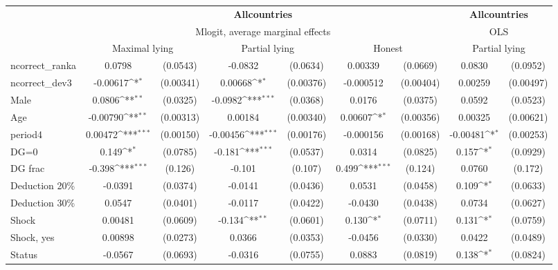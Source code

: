 \def\sym#1{\ifmmode^{#1}\else\(^{#1}\)\fi}
\begin{tabular}{l|cccccc|cc}
\hline\hline
&\multicolumn{6}{c|}{\bf All\space{}countries}&\multicolumn{2}{c}{\bf All\space{}countries}\\ &\multicolumn{6}{c|}{Mlogit, average marginal effects }&\multicolumn{2}{c}{OLS}\\
                &\multicolumn{2}{c}{Maximal lying}&\multicolumn{2}{c}{Partial lying}&\multicolumn{2}{c}{Honest}  &\multicolumn{2}{c}{Partial lying}\\
\hline
ncorrect\_ranka  &   0.0798         & (0.0543)&  -0.0832         & (0.0634)&  0.00339         & (0.0669)&   0.0830         & (0.0952)\\
ncorrect\_dev3   & -0.00617\sym{*}  &(0.00341)&  0.00668\sym{*}  &(0.00376)&-0.000512         &(0.00404)&  0.00259         &(0.00497)\\
Male            &   0.0806\sym{**} & (0.0325)&  -0.0982\sym{***}& (0.0368)&   0.0176         & (0.0375)&   0.0592         & (0.0523)\\
Age             & -0.00790\sym{**} &(0.00313)&  0.00184         &(0.00340)&  0.00607\sym{*}  &(0.00356)&  0.00325         &(0.00621)\\
period4         &  0.00472\sym{***}&(0.00150)& -0.00456\sym{***}&(0.00176)&-0.000156         &(0.00168)& -0.00481\sym{*}  &(0.00253)\\
DG=0          &    0.149\sym{*}  & (0.0785)&   -0.181\sym{***}& (0.0537)&   0.0314         & (0.0825)&    0.157\sym{*}  & (0.0929)\\
DG frac         &   -0.398\sym{***}&  (0.126)&   -0.101         &  (0.107)&    0.499\sym{***}&  (0.124)&   0.0760         &  (0.172)\\
Deduction 20\%&  -0.0391         & (0.0374)&  -0.0141         & (0.0436)&   0.0531         & (0.0458)&    0.109\sym{*}  & (0.0633)\\
Deduction 30\%&   0.0547         & (0.0401)&  -0.0117         & (0.0422)&  -0.0430         & (0.0438)&   0.0734         & (0.0627)\\
Shock         &  0.00481         & (0.0609)&   -0.134\sym{**} & (0.0601)&    0.130\sym{*}  & (0.0711)&    0.131\sym{*}  & (0.0759)\\
Shock, yes    &  0.00898         & (0.0273)&   0.0366         & (0.0353)&  -0.0456         & (0.0330)&   0.0422         & (0.0489)\\
Status        &  -0.0567         & (0.0693)&  -0.0316         & (0.0755)&   0.0883         & (0.0819)&    0.138\sym{*}  & (0.0824)\\

\end{tabular}
